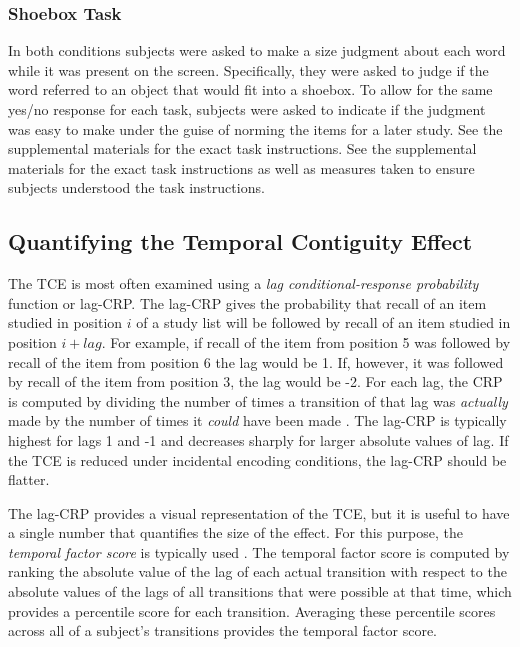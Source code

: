 \documentclass[jou,natbib,floatsintext]{apa6} %
\begin{document}
\subsubsection{Shoebox Task} In both conditions subjects were asked to make a size judgment about each word while it was present on the screen. Specifically, they were asked  to judge if the word referred to an object that would fit into a shoebox. To allow for the same yes/no response for each task, subjects were asked to indicate if the judgment was easy to make under the guise of norming the items for a later study. See the supplemental materials for the exact task instructions. See the supplemental materials for the exact task instructions as well as measures taken to ensure subjects understood the task instructions.

\subsection{Quantifying the Temporal Contiguity Effect} The TCE is most often examined using a \textit{lag conditional-response probability} function or lag-CRP. The lag-CRP gives the probability that recall of an item studied in position $i$ of a study list will be followed by recall of an item studied in position $i+lag$. For example, if recall of the item from position 5 was followed by recall of the item from position 6 the lag would be 1. If, however, it was followed by recall of the item from position 3, the lag would be -2. For each lag, the CRP is computed by dividing the number of times a transition of that lag was \emph{actually} made by the number of times it \emph{could} have been made \citep[e.g., it could not have been made if the item $i+lag$ was already recalled;][]{Kaha96}. The lag-CRP is typically highest for lags 1 and -1 and decreases sharply for larger absolute values of lag. If the TCE is reduced under incidental encoding conditions, the lag-CRP should be flatter.

The lag-CRP provides a visual representation of the TCE, but it is useful to have a single number that quantifies the size of the effect. For this purpose, the \emph{temporal factor score} is typically used \citep{SedeEtal10,PolyEtal09}. The temporal factor score is computed by ranking the absolute value of the lag of each actual transition with respect to the absolute values of the lags of all transitions that were possible at that time, which provides a percentile score for each transition. Averaging these percentile scores across all of a subject's transitions provides the temporal factor score.
 
\end{document}

